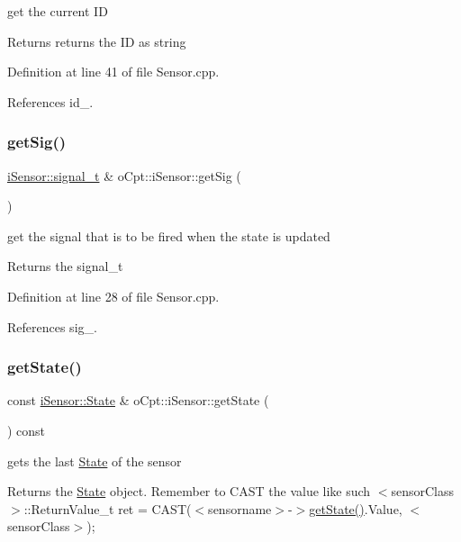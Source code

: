 get the current ID \begin{DoxyReturn}{Returns}
returns the ID as string 
\end{DoxyReturn}


Definition at line 41 of file Sensor.\+cpp.



References id\+\_\+.

\hypertarget{classo_cpt_1_1i_sensor_ad63e4d791b76f8328d652c4ed79eaec3}{}\label{classo_cpt_1_1i_sensor_ad63e4d791b76f8328d652c4ed79eaec3} 
\subsubsection{\texorpdfstring{get\+Sig()}{getSig()}}
{\footnotesize\ttfamily \hyperlink{classo_cpt_1_1i_sensor_a2e6d170acbc05f0b557bb68671813f6d}{i\+Sensor\+::signal\+\_\+t} \& o\+Cpt\+::i\+Sensor\+::get\+Sig (\begin{DoxyParamCaption}{ }\end{DoxyParamCaption})}

get the signal that is to be fired when the state is updated \begin{DoxyReturn}{Returns}
the signal\+\_\+t 
\end{DoxyReturn}


Definition at line 28 of file Sensor.\+cpp.



References sig\+\_\+.

\hypertarget{classo_cpt_1_1i_sensor_a9ab760449e01c754c30374641c51ac66}{}\label{classo_cpt_1_1i_sensor_a9ab760449e01c754c30374641c51ac66} 
\subsubsection{\texorpdfstring{get\+State()}{getState()}}
{\footnotesize\ttfamily const \hyperlink{structo_cpt_1_1i_sensor_1_1_state}{i\+Sensor\+::\+State} \& o\+Cpt\+::i\+Sensor\+::get\+State (\begin{DoxyParamCaption}{ }\end{DoxyParamCaption}) const}

gets the last \hyperlink{structo_cpt_1_1i_sensor_1_1_state}{State} of the sensor \begin{DoxyReturn}{Returns}
the \hyperlink{structo_cpt_1_1i_sensor_1_1_state}{State} object. Remember to C\+A\+ST the value like such $<$sensor\+Class$>$\+::\+Return\+Value\+\_\+t ret = C\+A\+ST($<$sensorname$>$-\/$>$\hyperlink{classo_cpt_1_1i_sensor_a9ab760449e01c754c30374641c51ac66}{get\+State()}.Value, $<$sensor\+Class$>$); 
\end{DoxyReturn}


